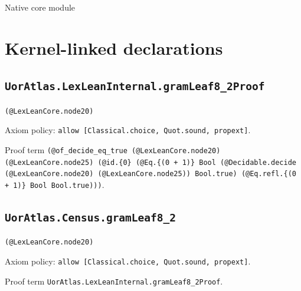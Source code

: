 \documentclass[11pt]{article}
\begin{document}
\begin{center}{\LARGE Native core module}\end{center}
\section*{Kernel-linked declarations}
\subsection*{\texttt{UorAtlas.LexLeanInternal.gramLeaf8\_2Proof}}
\noindent\texttt{(@LexLeanCore.node20)}\par
\noindent Axiom policy: \texttt{allow [Classical.choice, Quot.sound, propext]}.\par
\noindent Proof term \texttt{(@of\_decide\_eq\_true (@LexLeanCore.node20) (@LexLeanCore.node25) (@id.\{0\} (@Eq.\{(0 + 1)\} Bool (@Decidable.decide (@LexLeanCore.node20) (@LexLeanCore.node25)) Bool.true) (@Eq.refl.\{(0 + 1)\} Bool Bool.true)))}.\par
\subsection*{\texttt{UorAtlas.Census.gramLeaf8\_2}}
\noindent\texttt{(@LexLeanCore.node20)}\par
\noindent Axiom policy: \texttt{allow [Classical.choice, Quot.sound, propext]}.\par
\noindent Proof term \texttt{UorAtlas.LexLeanInternal.gramLeaf8\_2Proof}.\par
\end{document}
